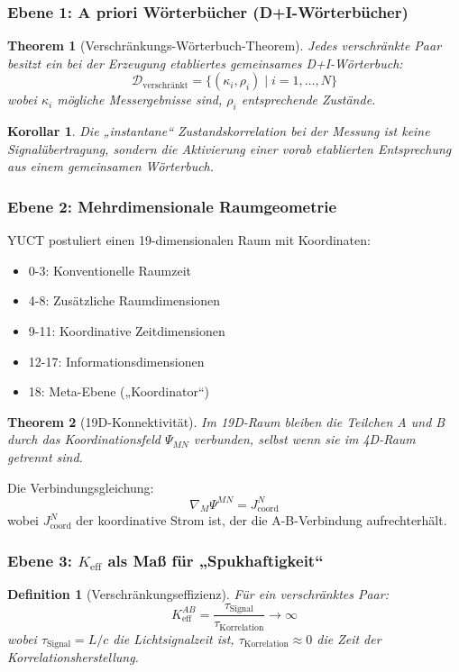 \documentclass[11pt,a4paper]{article}
\newtheorem{theorem}{Theorem}
\newtheorem{definition}{Definition}
\newtheorem{corollary}{Korollar}
\begin{document}
	\subsubsection{Ebene 1: A priori Wörterbücher (D+I-Wörterbücher)}
	\begin{theorem}[Verschränkungs-Wörterbuch-Theorem]
		Jedes verschränkte Paar besitzt ein bei der Erzeugung etabliertes gemeinsames D+I-Wörterbuch:
		\begin{equation}
			\mathcal{D}_{\text{verschränkt}} = \{(\kappa_i, \rho_i) \mid i = 1,\dots,N\}
		\end{equation}
		wobei $\kappa_i$ mögliche Messergebnisse sind, $\rho_i$ entsprechende Zustände.
	\end{theorem}
	
	\begin{corollary}
		Die „instantane“ Zustandskorrelation bei der Messung ist keine Signalübertragung, sondern die Aktivierung einer vorab etablierten Entsprechung aus einem gemeinsamen Wörterbuch.
	\end{corollary}
	
	\subsubsection{Ebene 2: Mehrdimensionale Raumgeometrie}
	YUCT postuliert einen 19-dimensionalen Raum mit Koordinaten:
	\begin{itemize}
		\item 0-3: Konventionelle Raumzeit
		\item 4-8: Zusätzliche Raumdimensionen
		\item 9-11: Koordinative Zeitdimensionen
		\item 12-17: Informationsdimensionen
		\item 18: Meta-Ebene („Koordinator“)
	\end{itemize}
	
	\begin{theorem}[19D-Konnektivität]
		Im 19D-Raum bleiben die Teilchen A und B durch das Koordinationsfeld $\Psi_{MN}$ verbunden, selbst wenn sie im 4D-Raum getrennt sind.
	\end{theorem}
	
	Die Verbindungsgleichung:
	\begin{equation}
		\nabla_M \Psi^{MN} = J^N_{\text{coord}}
	\end{equation}
	wobei $J^N_{\text{coord}}$ der koordinative Strom ist, der die A-B-Verbindung aufrechterhält.
	
	\subsubsection{Ebene 3: $K_{\mathrm{eff}}$ als Maß für „Spukhaftigkeit“}
	\begin{definition}[Verschränkungseffizienz]
		Für ein verschränktes Paar:
		\begin{equation}
			K_{\mathrm{eff}}^{AB} = \frac{\tau_{\text{Signal}}}{\tau_{\text{Korrelation}}} \to \infty
		\end{equation}
		wobei $\tau_{\text{Signal}} = L/c$ die Lichtsignalzeit ist, $\tau_{\text{Korrelation}} \approx 0$ die Zeit der Korrelationsherstellung.
	\end{definition}
	
\end{document}
